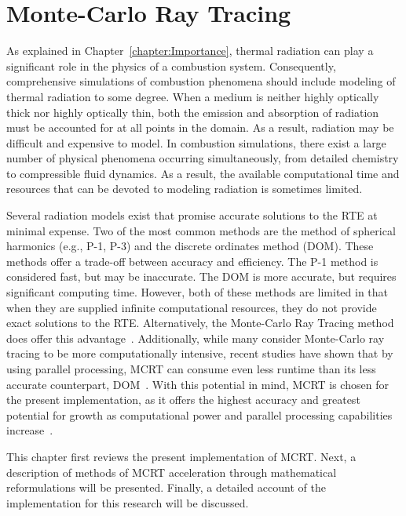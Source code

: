 \addchapheadtotoc
\chapter{Monte-Carlo Ray Tracing}\label{chapter:Modeling}
As explained in Chapter~\ref{chapter:Importance}, thermal radiation can play a significant role in the physics of a combustion system. Consequently, comprehensive simulations of combustion phenomena should include modeling of thermal radiation to some degree. 
When a medium is neither highly optically thick nor highly optically thin, both the emission and absorption of radiation must be accounted for at all points in the domain. As a result, radiation may be difficult and expensive to model.
In combustion simulations, there exist a large number of physical phenomena occurring simultaneously, from detailed chemistry to compressible fluid dynamics. As a result, the available computational time and resources that can be devoted to modeling radiation is sometimes limited.

Several radiation models exist that promise accurate solutions to the RTE at minimal expense. Two of the most common methods are the method of spherical harmonics (e.g., P-1, P-3) and the discrete ordinates method (DOM).
These methods offer a trade-off between accuracy and efficiency. The P-1 method is considered fast, but may be inaccurate. The DOM is more accurate, but requires significant computing time. 
However, both of these methods are limited in that when they are supplied infinite computational resources, they do not provide exact solutions to the RTE. Alternatively, the Monte-Carlo Ray Tracing method does offer this advantage~\cite{Leccese2018ConvectiveChambers}.
Additionally, while many consider Monte-Carlo ray tracing to be more computationally intensive, recent studies have shown that by using parallel processing, MCRT can consume even less runtime than its less accurate counterpart, DOM~\cite{Humphrey2016RadiativeRefinement}.
With this potential in mind, MCRT is chosen for the present implementation, as it offers the highest accuracy and greatest potential for growth as computational power and parallel processing capabilities increase~\cite{Liu2020TheFlames,Howell2010ThermalTransfer}.

This chapter first reviews the present implementation of MCRT.
Next, a description of methods of MCRT acceleration through mathematical reformulations will be presented.
Finally, a detailed account of the implementation for this research will be discussed.

